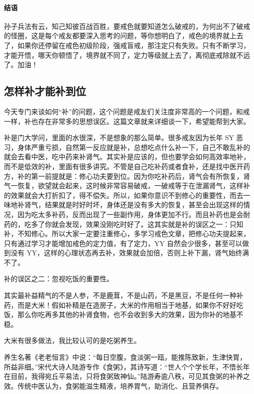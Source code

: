 \documentclass[fontset=founder]{ctexart}
\begin{document}
\paragraph{结语}

孙子兵法有云，知己知彼百战百胜，要戒色就要知道怎么破戒的，为何出不了破戒的怪圈，这是每个戒友都要深入思考的问题，等你想明白了，戒色的境界就上去了，如果你还停留在戒色初级阶段，强戒盲戒，那注定只有失败。只有不断学习，才能开悟，哪天你顿悟了，境界就不同了，定力等级就上去了，离彻底戒除就不远了。加油！

\subsection{怎样补才能补到位}

今天专门来谈如何“补”的问题，这个问题是戒友们关注度非常高的一个问题，和戒一样，补也存在非常多的思想误区。这篇文章就来详细谈一下，希望能帮到大家。

补是门大学问，里面的水很深，不是想象的那么简单。很多戒友因为长年 SY 恶习，身体严重亏损，自然第一反应就是补，总想吃点什么补一下，自己不敢乱补的就会去看中医，吃中药来补肾气。其实补是应该的，但也要学会如何高效率地补，而不是低效的补，里面有很多讲究。不管是自己吃补药或者食补，还是找中医开药方，补的第一前提就是：修心功夫要到位。因为你吃补药后，肾气会有所恢复，肾气一恢复，欲望就会起来，这时候非常容易破戒，一破戒等于在泄漏肾气，这样补的效果就会大打折扣了，得不偿失。所以，如果你意识不到修心的重要性，而去一味地补肾气，结果就是时好时坏，身体还是没有多大的恢复，甚至会出现这样的情况，因为吃太多补药，反而出现了一些副作用，身体更加不行。而且补药也是会耐药的，吃多了你就会发现，效果没刚吃时好了。这其实就是补的误区之一：只知补，不知修心。所以大家一定要注重修心，多学习戒色文章，把修心功夫提起来，只有通过学习才能增加戒色的定力值，有了定力，YY 自然会少很多，甚至可以做到没有 YY，这样的心理状态再去补，效果就会加倍，否则上补下漏，肾气始终满不了。

补的误区之二：忽视吃饭的重要性。

其实最补益精气的不是人参，不是鹿茸，不是山药，不是黑豆，不是任何一种补药，而是大米！假如补精是在造房子，大米的作用相当于地基，如果你不好好吃饭，那么你吃再多其他的补肾食物，也不会收到多大的效果，因为你补的地基不稳。

大米有很多做法，我比较认可的是吃粥养生。

养生名著《老老恒言》中说：“每日空腹，食淡粥一瓯，能推陈致新，生津快胃，所益非细。”宋代大诗人陆游专作《食粥》，其诗写道：“世人个个学长年，不悟长年在目前，我得宛丘平易法，只将食粥致神仙。”陆游寿逾八秩，可见其食粥的补养之效。传统中医认为，食粥能滋生精液，培养胃气，助消化、且营养俱存。
\end{document}
